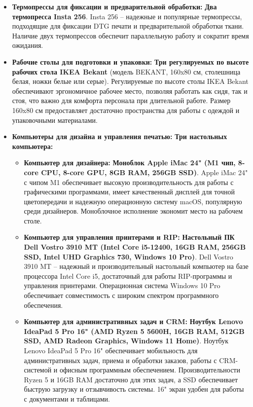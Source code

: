 \begin{itemize}
    \item \textbf{Термопрессы для фиксации и предварительной обработки:} \textbf{Два термопресса Insta 256}.  Insta 256 – надежные и популярные термопрессы, подходящие для фиксации DTG печати и предварительной обработки ткани.  Наличие двух термопрессов обеспечит параллельную работу и сократит время ожидания.
    \item \textbf{Рабочие столы для подготовки и упаковки:} \textbf{Три регулируемых по высоте рабочих стола IKEA Bekant} (модель BEKANT, 160x80 см, столешница белая, ножки белые или серые).  Регулируемые по высоте столы IKEA Bekant обеспечивают эргономичное рабочее место, позволяя работать как сидя, так и стоя, что важно для комфорта персонала при длительной работе.  Размер 160x80 см предоставляет достаточно пространства для работы с одеждой и упаковочными материалами.
    \item \textbf{Компьютеры для дизайна и управления печатью:} \textbf{Три настольных компьютера:}
        \begin{itemize}
            \item \textbf{Компьютер для дизайнера:} \textbf{Моноблок Apple iMac 24" (M1 чип, 8-core CPU, 8-core GPU, 8GB RAM, 256GB SSD)}.  Apple iMac 24" с чипом M1 обеспечивает высокую производительность для работы с графическими программами, имеет качественный дисплей для точной цветопередачи и надежную операционную систему macOS, популярную среди дизайнеров.  Моноблочное исполнение экономит место на рабочем столе.
            \item \textbf{Компьютер для управления принтерами и RIP:} \textbf{Настольный ПК Dell Vostro 3910 MT (Intel Core i5-12400, 16GB RAM, 256GB SSD, Intel UHD Graphics 730, Windows 10 Pro)}.  Dell Vostro 3910 MT – надежный и производительный настольный компьютер на базе процессора Intel Core i5, достаточный для работы RIP-программы и управления принтерами.  Операционная система Windows 10 Pro обеспечивает совместимость с широким спектром программного обеспечения.
            \item \textbf{Компьютер для административных задач и CRM:} \textbf{Ноутбук Lenovo IdeaPad 5 Pro 16" (AMD Ryzen 5 5600H, 16GB RAM, 512GB SSD, AMD Radeon Graphics, Windows 11 Home)}.  Ноутбук Lenovo IdeaPad 5 Pro 16" обеспечивает мобильность для административных задач, приема и обработки заказов, работы с CRM-системой и офисным программным обеспечением.  Производительности Ryzen 5 и 16GB RAM достаточно для этих задач, а SSD обеспечивает быструю загрузку и отзывчивость системы.  16" экран удобен для работы с документами и таблицами.

\end{itemize}
\end{itemize}
